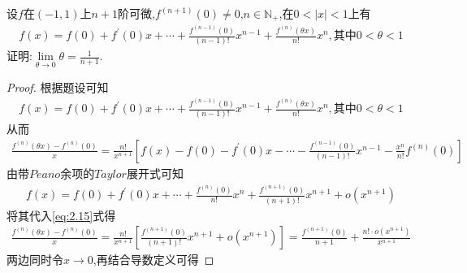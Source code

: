 \documentclass[lang=cn,newtx,10pt,scheme=chinese]{../Template/elegantbook}
\begin{document}
\begin{exercise}
    设\(f\)在\((-1,1)\)上\(n + 1\)阶可微,\(f^{(n + 1)}(0)\neq0\),\(n\in\mathbb{N}_+\),在\(0<|x|<1\)上有
    \begin{gather}
        f\left( x \right) =f\left( 0 \right) +f^{\prime}\left( 0 \right) x+\cdots +\frac{f^{\left( n-1 \right)}\left( 0 \right)}{\left( n-1 \right) !}x^{n-1}+\frac{f^{\left( n \right)}\left( \theta x \right)}{n!}x^n,\text{其中}0<\theta <1
        \nonumber
    \end{gather}
    证明:$\lim\limits_{\theta\to0}\theta=\frac{1}{n + 1}$.
\end{exercise}
    \begin{proof}
        根据题设可知
        \begin{gather}
            f\left( x \right) =f\left( 0 \right) +f^{\prime}\left( 0 \right) x+\cdots +\frac{f^{\left( n-1 \right)}\left( 0 \right)}{\left( n-1 \right) !}x^{n-1}+\frac{f^{\left( n \right)}\left( \theta x \right)}{n!}x^n,\text{其中}0<\theta <1
            \nonumber
        \end{gather}
        从而
        \begin{gather}\label{eq:2.15}
            \frac{f^{\left( n \right)}\left( \theta x \right) -f^{\left( n \right)}\left( 0 \right)}{x}=\frac{n!}{x^{n+1}}\left[ f\left( x \right) -f\left( 0 \right) -f^{\prime}\left( 0 \right) x-\cdots -\frac{f^{\left( n-1 \right)}\left( 0 \right)}{\left( n-1 \right) !}x^{n-1}-\frac{x^n}{n!}f^{\left( n \right)}\left( 0 \right) \right] 
        \end{gather}
        由带$Peano$余项的$Taylor$展开式可知
        \begin{gather}
            f\left( x \right) =f\left( 0 \right) +f^{\prime}\left( 0 \right) x+\cdots +\frac{f^{\left( n \right)}\left( 0 \right)}{n!}x^n+\frac{f^{\left( n+1 \right)}\left( 0 \right)}{\left( n+1 \right) !}x^{n+1}+o\left( x^{n+1} \right) 
            \nonumber
        \end{gather}
        将其代入\eqref{eq:2.15}式得
        \begin{gather}
            \frac{f^{\left( n \right)}\left( \theta x \right) -f^{\left( n \right)}\left( 0 \right)}{x}=\frac{n!}{x^{n+1}}\left[ \frac{f^{\left( n+1 \right)}\left( 0 \right)}{\left( n+1 \right) !}x^{n+1}+o\left( x^{n+1} \right) \right] =\frac{f^{\left( n+1 \right)}\left( 0 \right)}{n+1}+\frac{n!\cdot o\left( x^{n+1} \right)}{x^{n+1}}
            \nonumber
        \end{gather}
        两边同时令$x\to0$,再结合导数定义可得

\end{proof}
\end{document}
